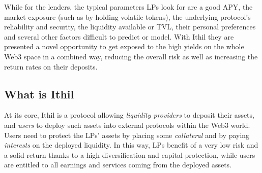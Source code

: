 \documentclass[a4paper,10 pt]{article}
\theoremstyle{definition}
\begin{document}
While for the lenders, the typical parameters LPs look for are a good APY, the market exposure (such as by holding volatile tokens), the underlying protocol's reliability and security, the liquidity available or TVL, their personal preferences and several other factors difficult to predict or model.
With Ithil they are presented a novel opportunity to get exposed to the high yields on the whole Web3 space in a combined way, reducing the overall risk as well as increasing the return rates on their deposits.

\subsection{What is Ithil}

At its core, Ithil is a protocol allowing {\it liquidity providers} to deposit their assets, and {\it users} to deploy such assets into external protocols within the Web3 world. Users need to protect the LPs' assets by placing some {\it collateral} and by paying {\it interests} on the deployed liquidity. 
In this way, LPs benefit of a very low risk and a solid return thanks to a high diversification and capital protection, while users are entitled to all earnings and services coming from the deployed assets.
\end{document}
